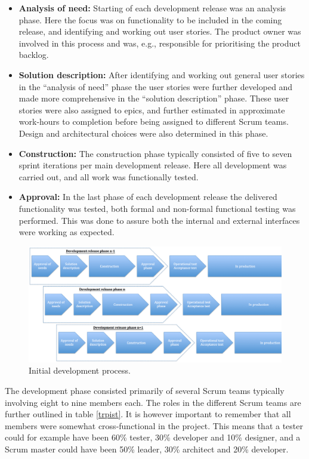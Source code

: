 \begin{itemize}
   \item \textbf{Analysis of need:} Starting of each development release was an analysis phase. Here the focus was on functionality to be included in the coming release, and identifying and working out user stories. The product owner was involved in this process and was, e.g., responsible for prioritising the product backlog.
   \item \textbf{Solution description:} After identifying and working out general user stories in the ``analysis of need'' phase the user stories were further developed and made more comprehensive in the ``solution description'' phase. These user stories were also assigned to epics, and further estimated in approximate work-hours to completion before being assigned to different Scrum teams. Design and architectural choices were also determined in this phase.
   \item \textbf{Construction:} The construction phase typically consisted of five to seven sprint iterations per main development release. Here all development was carried out, and all work was functionally tested.
   \item \textbf{Approval:} In the last phase of each development release the delivered functionality was tested, both formal and non-formal functional testing was performed. This was done to assure both the internal and external interfaces were working as expected.
\end{itemize}

\begin{figure}[H]
\centering
\includegraphics[trim = 0mm 0mm 0mm 0mm,width=\textwidth]{images/initial_development_process}
\caption{Initial development process.}
\label{initial_development_process}
\end{figure}

The development phase consisted primarily of several Scrum teams typically involving eight to nine members each. The roles in the different Scrum teams are further outlined in table \ref{trpist}. It is however important to remember that all members were somewhat cross-functional in the project. This means that a tester could for example have been 60\% tester, 30\% developer and 10\% designer, and a Scrum master could have been 50\% leader, 30\% architect and 20\% developer. 

